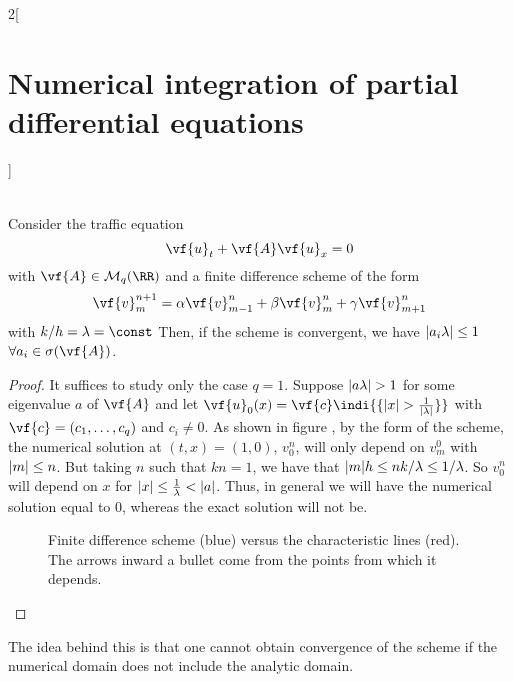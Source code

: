 \documentclass[../../../main_math.tex]{subfiles}
\begin{document}
\begin{multicols}{2}[\section{Numerical integration of partial differential equations}]
\begin{sproof}
\begin{align*}
    \end{align*}
  \end{sproof}
  \begin{theorem}
    Consider the traffic equation $$\vf{u}_t+\vf{A}\vf{u}_x=0$$ with $\vf{A}\in\mathcal{M}_q(\RR)$ and a finite difference scheme of the form $$\vf{v}_m^{n+1}=\alpha \vf{v}_{m-1}^n+\beta \vf{v}_m^n+\gamma \vf{v}_{m+1}^n$$ with $k/h=\lambda=\const$ Then, if the scheme is convergent, we have $\abs{a_i\lambda}\leq 1$ $\forall a_i\in\sigma(\vf{A})$.
  \end{theorem}
  \begin{proof}
    It suffices to study only the case $q=1$. Suppose $\abs{a\lambda}>1$ for some eigenvalue $a$ of $\vf{A}$ and let $\vf{u}_0(x)=\vf{c}\indi{\{\abs{x}> \frac{1}{\abs{\lambda}}\}}$ with $\vf{c}=(c_1,\ldots,c_q)$ and $c_i\ne 0$. As shown in figure , by the form of the scheme, the numerical solution at $(t,x)=(1,0)$, $v_0^n$, will only depend on $v_m^0$ with $\abs{m}\leq n$. But taking $n$ such that $kn=1$, we have that $\abs{m}h\leq nk/\lambda\leq 1/\lambda$. So $v_0^n$ will depend on $x$ for $\abs{x}\leq \frac{1}{\lambda}<\abs{a}$. Thus, in general we will have the numerical solution equal to 0, whereas the exact solution will not be.
    \begin{figure}[H]
      \centering
      
      \caption{Finite difference scheme (blue) versus the characteristic lines (red). The arrows inward a bullet come from the points from which it depends.}
      \label{NIPDE:courant-friedrichs-lewy_fig}
    \end{figure}
  \end{proof}
  \begin{remark}
    The idea behind this is that one cannot obtain convergence of the scheme if the numerical domain does not include the analytic domain.
  \end{remark}

\end{multicols}
\end{document}

